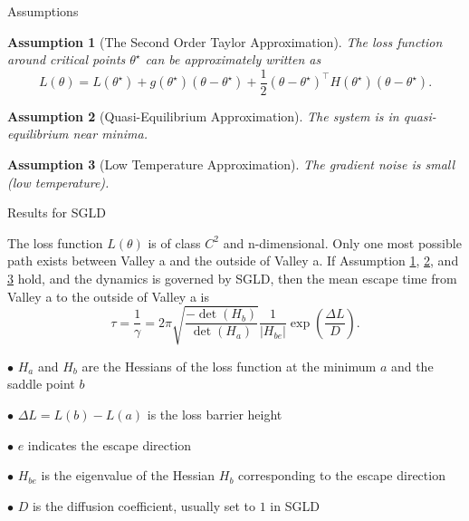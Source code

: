 \documentclass{beamer}
\newtheorem{assumption}{Assumption}
\begin{document}
\begin{frame}{Assumptions}
    \begin{assumption}[The Second Order Taylor Approximation]
 \label{as:1}
 The loss function around critical points $\theta^{\star}$ can be approximately written as 
 \[ L(\theta) = L(\theta^{\star}) + g(\theta^{\star})(\theta - \theta^{\star}) + \frac{1}{2}(\theta -\theta^{\star})^{\top} H(\theta^{\star}) (\theta -\theta^{\star}).\]
\end{assumption} 
 \begin{assumption}[Quasi-Equilibrium Approximation]
  \label{as:2}
The system is in quasi-equilibrium near minima.
 \end{assumption}
  \begin{assumption}[Low Temperature Approximation]
   \label{as:3}
The gradient noise is small (low temperature). 
 \end{assumption}
\end{frame}

\begin{frame}{Results for SGLD}
     \begin{theorem}
 \label{pr:SGLD}
 The loss function $L(\theta)$ is of class $C^{2}$ and n-dimensional. Only one most possible path exists between Valley a and the outside of Valley a. If Assumption \ref{as:1}, \ref{as:2}, and \ref{as:3} hold, and the dynamics is governed by SGLD, then the mean escape time from Valley a to the outside of Valley a  is
 \[ \tau = \frac{1}{\gamma}=   2\pi  \sqrt{ \frac{-  \det (H_{b}) }{  \det (H_{a})} }  \frac{1}{|H_{be}|} \exp\left(\frac{\Delta L}{D}\right) . \]
 \end{theorem}
\vspace{-3mm}
$\bullet$ $H_{a}$ and $H_{b}$ are the Hessians of the loss function at the minimum $a$ and the saddle point $b$ 

$\bullet$ $\Delta L = L(b) - L(a)$ is the loss barrier height

$\bullet$ $e$ indicates the escape direction

$\bullet$ $H_{be}$ is the eigenvalue of the Hessian $H_{b}$ corresponding to the escape direction

$\bullet$ $D$ is the diffusion coefficient, usually set to $1$ in SGLD
\end{frame}
\end{document}
